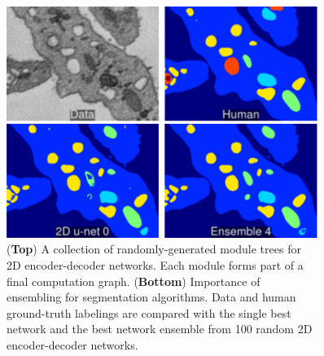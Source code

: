 \documentclass[final]{beamer}
\newlength{\sepwid}
\newlength{\onecolwid}
\begin{document}
\begin{frame}[t]
\begin{columns}[t]
\begin{column}{\onecolwid}
\begin{center}
\begin{figure}
\includegraphics[width=\linewidth]{fig/top4.png}
\caption{(\textbf{Top}) A collection of randomly-generated module trees for 2D encoder-decoder networks. Each module forms part of a final computation graph. (\textbf{Bottom}) Importance of ensembling for segmentation algorithms. Data and human ground-truth labelings are compared with the single best network and the best network ensemble from 100 random 2D encoder-decoder networks.}
\end{figure}

\end{center}

\end{column}


\begin{column}{\sepwid}\end{column} %


\begin{column}{\onecolwid}


\end{column}
\end{columns}
\end{frame}
\end{document}
